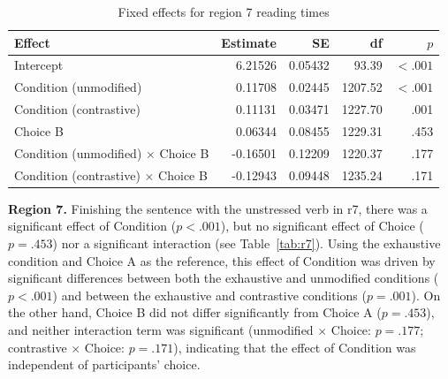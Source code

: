 \documentclass[a4paper, ruler]{CUP-JNL-LIN}%
\begin{document}
\begin{table}[htbp]
\centering
\caption{Fixed effects for region 7 reading times}
\label{tab:r7-fixed}
\begin{tabularx}{\textwidth}{@{}Xrrrr@{}}
\toprule
Effect & Estimate & SE & df & $p$ \\
\midrule
Intercept & 6.21526 & 0.05432 & 93.39 & $< .001$ \\
Condition (unmodified) & 0.11708 & 0.02445 & 1207.52 & $< .001$ \\
Condition (contrastive) & 0.11131 & 0.03471 & 1227.70 & .001 \\
Choice B & 0.06344 & 0.08455 & 1229.31 & .453 \\
Condition (unmodified) $\times$ Choice B & -0.16501 & 0.12209 & 1220.37 & .177 \\
Condition (contrastive) $\times$ Choice B & -0.12943 & 0.09448 & 1235.24 & .171 \\
\bottomrule
\end{tabularx}
\end{table}


\noindent \textbf{Region 7.} Finishing the sentence with the unstressed verb in r7, there was a significant effect of Condition ($p<.001$), but no significant effect of Choice ($p=.453$) nor a significant interaction (see Table~\ref{tab:r7}). Using the exhaustive condition and Choice A as the reference, this effect of Condition was driven by significant differences between both the exhaustive and unmodified conditions ($p<.001$) and between the exhaustive and contrastive conditions ($p=.001$). On the other hand, Choice B did not differ significantly from Choice A ($p=.453$), and neither interaction term was significant (unmodified $\times$ Choice: $p=.177$; contrastive $\times$ Choice: $p=.171$), indicating that the effect of Condition was independent of participants' choice.


\end{document}

